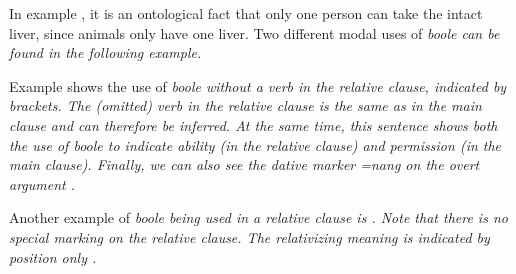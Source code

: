 
In example , it is an ontological fact that only one person can take the intact liver, since animals only have one liver.   Two different modal  uses of \em boole \em can be found in the following example.



Example  shows the use of \em boole \em without a verb in the relative clause, indicated by brackets. The (omitted) verb in the relative clause is the same as in the main clause  and can therefore be inferred. At the same time, this sentence shows both the use of \em boole \em to indicate   ability (in the relative clause) and   permission (in the main clause). Finally, we can also see the dative marker \em =nang \em on the overt argument .

Another example of  \em boole \em being used in a relative clause is . Note that there is no special marking on the relative clause. The relativizing meaning is indicated by position only .





%
%

